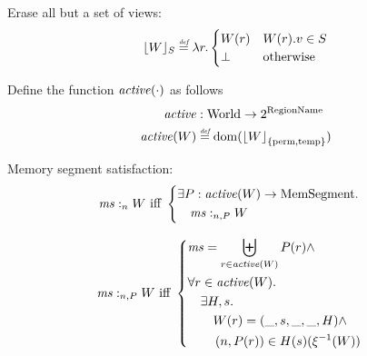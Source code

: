 \documentclass[a4paper]{article}
\DeclarePairedDelimiter\floor{\lfloor}{\rfloor}
\newcommand{\fun}{\rightarrow}
\newcommand{\defeq}{\stackrel{\textit{\tiny{def}}}{=}}
\DeclareMathOperator{\dom}{dom}
\newcommand{\var}[1]{\mathit{#1}}
\newcommand{\hs}{\var{ms}}
\newcommand{\ms}{\hs}
\newcommand{\heap}{\var{mem}}
\newcommand{\plainfun}[2]{
  \ifthenelse{\equal{#2}{}}
  {\mathit{#1}}
  {\mathit{#1}(#2)}
}
\newcommand{\erase}[2]{\floor*{#1}_{\{#2\}}}
\newcommand{\activeReg}[1]{\plainfun{active}{#1}}
\newcommand{\heapSat}[3][\heap]{#1 :_{#2} #3}
\newcommand{\memSatPar}[4][n]{\heapSat[#2]{#1 , #4}{#3}}
\newcommand{\plaindom}[1]{\mathrm{#1}}
\newcommand{\HeapSegments}{\plaindom{MemSegment}}
\newcommand{\RegionNames}{\plaindom{RegionName}}
\newcommand{\Worlds}{\plaindom{World}}
\newcommand{\npair}[2][n]{\left(#1,#2 \right)}
\newcommand{\plainview}[1]{\mathrm{#1}}
\newcommand{\perma}{\plainview{perm}}
\newcommand{\temp}{\plainview{temp}}
\begin{document}

Erase all but a set of views:
\begin{align*}
  \lfloor W \rfloor_S \defeq \lambda r \ldotp 
  \begin{cases}
    W(r) & W(r).v \in S\\
    \bot & \text{otherwise}
  \end{cases}
\end{align*}

Define the function $\activeReg{\cdot}$ as follows
\begin{align*}
  \activeReg{} & : \Worlds \fun 2^\RegionNames \\
  \activeReg{W} & \defeq \dom(\erase{W}{\perma,\temp})
\end{align*}


Memory segment satisfaction:
\begin{align*}
  &\heapSat[\hs]{n}{W} 
    \text{ iff }
    \left\{\begin{aligned}
        &\exists P : \activeReg{W} \rightarrow \HeapSegments \ldotp \\
        &\quad \memSatPar{\ms}{W}{P}
      \end{aligned}\right.
\end{align*}

\begin{align*}
  &\memSatPar{\ms}{W}{P}
    \text{ iff }
    \left\{\begin{aligned}
        &\hs = \biguplus_{r\in\activeReg{W}}P(r) \land \\
        &\forall r \in \activeReg{W} \ldotp\\
        &\quad \exists H,s \ldotp\\
        &\qquad W(r) = (\_,s,\_,\_,H) \land \\
        &\qquad \npair[n]{P(r)} \in H(s)(\xi^{-1}(W))\\
      \end{aligned}\right.
\end{align*}
\end{document}
